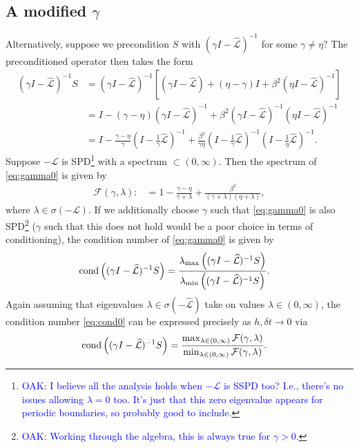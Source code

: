 \documentclass[a4paper,10pt]{article}
\newcommand{\tcb}{\textcolor{blue}}
\begin{document}
\subsection{A modified $\gamma$}

Alternatively, suppose we precondition $S$ with $(\gamma I- \widehat{\mathcal{L}})^{-1}$ for
some $\gamma \neq \eta$? The preconditioned operator then takes the form
%
\begin{align}\nonumber
(\gamma I- \widehat{\mathcal{L}})^{-1}S & = (\gamma I - \widehat{\mathcal{L}})^{-1}
	\left[ (\gamma I - \widehat{\mathcal{L}}) + (\eta-\gamma)I + \beta^2 (\eta I - \widehat{\mathcal{L}})^{-1}\right] \\
& = I - (\gamma - \eta)( \gamma I- \widehat{\mathcal{L}})^{-1} + 
	\beta^2( \gamma I- \widehat{\mathcal{L}})^{-1}
		( \eta I-\widehat{\mathcal{L}})^{-1} \nonumber\\
& = I - \frac{\gamma - \eta}{\gamma} ( I- \tfrac{1}{\gamma}\widehat{\mathcal{L}})^{-1} + 
	\frac{\beta^2}{\gamma\eta}( I- \tfrac{1}{\gamma}\widehat{\mathcal{L}})^{-1}
		( I- \tfrac{1}{\eta}\widehat{\mathcal{L}})^{-1}.\label{eq:gamma0}
\end{align}
%
Suppose $-\mathcal{L}$ is SPD\footnote{\tcb{OAK: I believe all the analysis holds when $-{\mathcal{L}}$ is SSPD too? I.e., there's no issues allowing $\lambda = 0$ too. It's just that this zero eigenvalue appears for periodic boundaries, so probably good to include.}} with a spectrum $\subset (0,\infty)$.
Then the spectrum of \eqref{eq:gamma0} is given by
%
\begin{align}\label{eq:eig_gamma}
\mathcal{F}(\gamma,\lambda) :&= 
	1 - \frac{\gamma-\eta}{\gamma + \lambda} + \frac{\beta^2}{(\gamma + \lambda)(\eta+\lambda)},
\end{align}
%
where $\lambda\in\sigma(-\mathcal{L})$. If we additionally choose $\gamma$
such that \eqref{eq:gamma0} is also SPD\footnote{\tcb{OAK: Working through the algebra, this is always true for $\gamma > 0$.}} ($\gamma$ such that this does not hold
would be a poor choice in terms of conditioning), the condition number of
\eqref{eq:gamma0} is given by
%
\begin{align}\label{eq:cond0}
\textnormal{cond}\left((\gamma I- \widehat{\mathcal{L}})^{-1}S\right) & =
	\frac{\lambda_{\max}\left((\gamma I- \widehat{\mathcal{L}})^{-1}S\right)}
		{\lambda_{\min}\left((\gamma I- \widehat{\mathcal{L}})^{-1}S\right)}.
\end{align}
%
Again assuming that eigenvalues $\lambda\in\sigma\left(-\widehat{\mathcal{L}}\right)$ take
on values $\lambda\in(0,\infty)$, the condition number \eqref{eq:cond0} can be expressed
precisely as $h,\delta t\to 0$ via
%
\begin{align}\label{eq:cond1}
\textnormal{cond}\left((\gamma I- \widehat{\mathcal{L}})^{-1}S\right) & =
	\frac{\max_{\lambda\in(0,\infty)} \mathcal{F}(\gamma,\lambda)}
		{\min_{\lambda\in(0,\infty)} \mathcal{F}(\gamma,\lambda)}.
\end{align}
%
\end{document}
